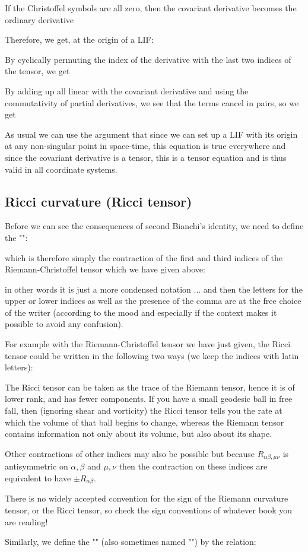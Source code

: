 	If the Christoffel symbols are all zero, then the covariant derivative becomes the ordinary derivative
	
	Therefore, we get, at the origin of a LIF:
	
	By cyclically permuting the index of the derivative with the last two indices of the tensor, we get
	
	By adding up all linear with the covariant derivative and using the commutativity of partial derivatives, we see that the terms cancel in pairs, so we get
	
	As usual we can use the argument that since we can set up a LIF with its origin at any non-singular point in space-time, this equation is true everywhere and since the covariant derivative is a tensor, this is a tensor equation and is thus valid in all coordinate systems.
	
	
	\subsection{Ricci curvature (Ricci tensor)}\label{Ricci tensor}
	Before we can see the consequences of second Bianchi's identity, we need to define the "":
	
	which is therefore simply the contraction of the first and third indices of the Riemann-Christoffel tensor which we have given above:
	
	in other words it is just a more condensed notation ... and then the letters for the upper or lower indices as well as the presence of the comma are at the free choice of the writer (according to the mood and especially if the context makes it possible to avoid any confusion).

	For example with the Riemann-Christoffel tensor we have just given, the Ricci tensor could be written in the following two ways (we keep the indices with latin letters):
	
	The Ricci tensor can be taken as the trace of the Riemann tensor, hence it is of lower rank, and has fewer components. If you have a small geodesic ball in free fall, then (ignoring shear and vorticity) the Ricci tensor tells you the rate at which the volume of that ball begins to change, whereas the Riemann tensor contains information not only about its volume, but also about its shape. 
	
	Other contractions of other indices may also be possible but because $R_{\alpha\beta,\mu\nu}$ is antisymmetric on $\alpha,\beta$ and $\mu,\nu$ then the contraction on these indices are equivalent to have $\pm R_{\alpha\beta}$.
	\begin{tcolorbox}[title=Remark,colframe=black,arc=10pt]
	There is no widely accepted convention for the sign of the Riemann
curvature tensor, or the Ricci tensor, so check the sign conventions of whatever book you are reading!
	\end{tcolorbox}
	Similarly, we define the "\label{ricci scalar}" (also sometimes named "") by the relation:
	
